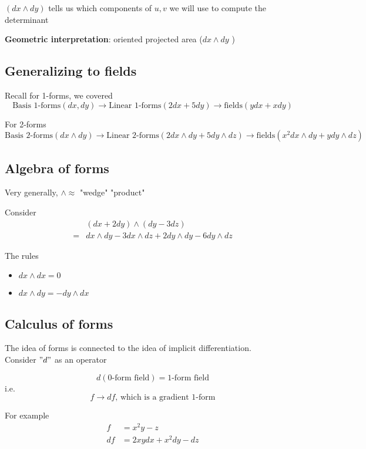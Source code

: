 $(dx \wedge dy)$ tells us which components of $u, v$ we will use to compute the determinant

\textbf{Geometric interpretation}: oriented projected area ($dx \wedge dy$ )


\subsection{Generalizing to fields}

Recall for 1-forms, we covered
\[
   \text{Basis 1-forms}(dx, dy) \rightarrow \text{Linear 1-forms} (2dx + 5dy) \rightarrow \text{fields}(ydx + xdy)
\] 

For 2-forms
\[
   \text{Basis 2-forms}(dx \wedge dy) \rightarrow \text{Linear 2-forms} (2dx \wedge dy + 5dy \wedge dz) \rightarrow \text{fields}(x^2dx \wedge dy + ydy \wedge dz)
\] 

\subsection{Algebra of forms}

Very generally, $\wedge \approx$ "wedge" "product"

Consider
\begin{align*}
   &(dx + 2dy) \wedge (dy - 3dz) \\
   =& dx \wedge dy - 3dx \wedge dz + 2 dy\wedge dy - 6 dy \wedge dz
\end{align*}

The rules
\begin{itemize}
   \item $dx \wedge dx = 0$
   \item $dx \wedge dy = - dy \wedge dx$
\end{itemize}

\subsection{Calculus of forms}

The idea of forms is connected to the idea of implicit differentiation. \\

Consider $"d"$ as an operator

\[
   d(\text{0-form field}) = \text{1-form field}
\] 
i.e.
\[
   f \rightarrow df \text{, which is a gradient 1-form}
\] 

For example
\begin{align*}
   f &= x^2 y - z \\
   df &= 2xy dx + x^2 dy - dz
\end{align*}


